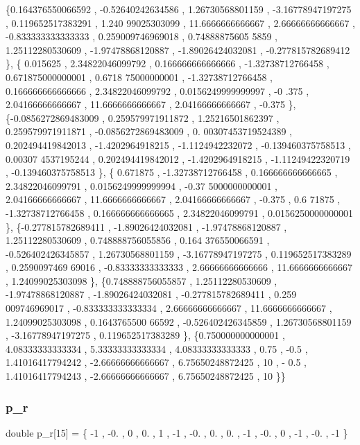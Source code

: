 \begin{DoxyCode}
\{0.164376550066592 , -0.52640242634586 ,  1.26730568801159 , -3.16778947197275 , 0.119652517383291 ,  1.240
      99025303099 ,  11.6666666666667 ,  2.66666666666667 , -0.833333333333333 , 0.259009746969018 , 0.74888875605
      5859 ,  1.25112280530609 , -1.97478868120887 , -1.89026424032081 , -0.277815782689412 \},
\{         0.015625 ,  2.34822046099792 , 0.166666666666666 , -1.32738712766458 , 0.671875000000001 , 0.6718
      75000000001 , -1.32738712766458 , 0.166666666666666 ,  2.34822046099792 , 0.0156249999999997 ,            -0
      .375 ,  2.04166666666667 ,  11.6666666666667 ,  2.04166666666667 ,            -0.375 \},
\{-0.0856272869483009 , 0.259579971911872 ,  1.25216501862397 , 0.259579971911871 , -0.0856272869483009 , 0.
      00307453719524389 , 0.202494419842013 ,  -1.4202964918215 ,  -1.1124942232072 , -0.139460375758513 , 0.00307
      4537195244 , 0.202494419842012 ,  -1.4202964918215 , -1.11249422320719 , -0.139460375758513 \},
\{         0.671875 , -1.32738712766458 , 0.166666666666665 ,  2.34822046099791 , 0.0156249999999994 , -0.37
      5000000000001 ,  2.04166666666667 ,  11.6666666666667 ,  2.04166666666667 ,            -0.375 ,          0.6
      71875 , -1.32738712766458 , 0.166666666666665 ,  2.34822046099791 , 0.0156250000000001 \},
\{-0.277815782689411 , -1.89026424032081 , -1.97478868120887 ,  1.25112280530609 , 0.748888756055856 , 0.164
      376550066591 , -0.526402426345857 ,  1.26730568801159 , -3.16778947197275 , 0.119652517383289 , 0.2590097469
      69016 , -0.83333333333333 ,  2.66666666666666 ,  11.6666666666667 ,  1.24099025303098 \},
\{0.748888756055857 ,  1.25112280530609 , -1.97478868120887 , -1.89026424032081 , -0.277815782689411 , 0.259
      009746969017 , -0.833333333333334 ,  2.66666666666667 ,  11.6666666666667 ,  1.24099025303098 , 0.1643765500
      66592 , -0.526402426345859 ,  1.26730568801159 , -3.16778947197275 , 0.119652517383289 \},
\{0.750000000000001 ,  4.08333333333334 ,  5.33333333333334 ,  4.08333333333333 ,              0.75 ,       
             -0.5 ,  1.41016417794242 , -2.66666666666667 ,  6.75650248872425 ,                10 ,              -
      0.5 ,  1.41016417794243 , -2.66666666666667 ,  6.75650248872425 ,                10 \}\}
\end{DoxyCode}
\mbox{\label{a00515_a7f75af9b47d708e0a032f0a11367b294}} 
\subsubsection{\texorpdfstring{p\+\_\+r}{p\_r}}
{\footnotesize\ttfamily double p\+\_\+r\mbox{[}15\mbox{]} = \{ -\/1 , -\/0. , 0 , 0. , 1 , -\/1 , -\/0. , 0. , 0. , -\/1 , -\/0. , 0 , -\/1 , -\/0. , -\/1 \}}

